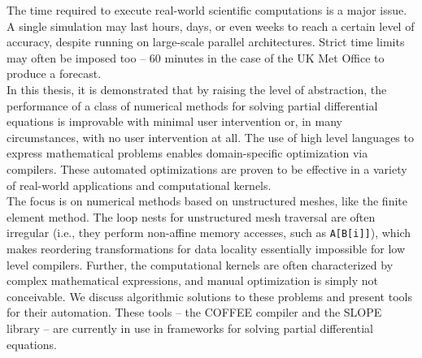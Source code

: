 The time required to execute real-world scientific computations is a major issue. A single simulation may last hours, days, or even weeks to reach a certain level of accuracy, despite running on large-scale parallel architectures. Strict time limits may often be imposed too -- 60 minutes in the case of the UK Met Office to produce a forecast. \\

In this thesis, it is demonstrated that by raising the level of abstraction, the performance of a class of numerical methods for solving partial differential equations is improvable with minimal user intervention or, in many circumstances, with no user intervention at all. The use of high level languages to express mathematical problems enables domain-specific optimization via compilers. These automated optimizations are proven to be effective in a variety of real-world applications and computational kernels. \\

The focus is on numerical methods based on unstructured meshes, like the finite element method. The loop nests for unstructured mesh traversal are often irregular (i.e., they perform non-affine memory accesses, such as {\tt A[B[i]]}), which makes reordering transformations for data locality essentially impossible for low level compilers. Further, the computational kernels are often characterized by complex mathematical expressions, and manual optimization is simply not conceivable. We discuss algorithmic solutions to these problems and present tools for their automation. These tools -- the COFFEE compiler and the SLOPE library -- are currently in use in frameworks for solving partial differential equations.